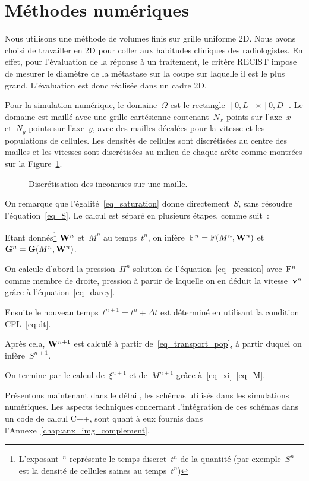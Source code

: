 \documentclass[main.tex]{subfiles}
\begin{document}
\section{Méthodes numériques}\label{sec:NumMet}

Nous utilisons une méthode de volumes finis sur grille uniforme 2D. 
Nous avons choisi de travailler en 2D pour coller aux habitudes cliniques des radiologistes. En effet, pour l'évaluation de la réponse à un traitement, le critère RECIST impose de mesurer le diamètre de la métastase sur la coupe sur laquelle il est le plus grand. L'évaluation est donc réalisée dans un cadre 2D.


Pour la simulation numérique, le domaine~$\Omega$ est le 
rectangle~$[0,L]\times[0,D]$. Le domaine est maillé avec une grille cartésienne contenant~$N_x$ points sur l'axe~$x$ et~$N_y$ points sur l'axe~$y$, avec des mailles décalées pour la vitesse et les populations de cellules. 
Les densités de cellules sont discrétisées au centre des mailles et les vitesses sont discrétisées au milieu de chaque arête comme montrées sur la Figure~\ref{fig:place_inconnues}.

\begin{figure}[h]
\centering

\caption{Discrétisation des inconnues sur une maille.\label{fig:place_inconnues}}
\end{figure}


On remarque que l'égalité~\eqref{eq_saturation} donne directement~$S$, sans résoudre l'équation~\eqref{eq_S}. Le calcul est séparé en plusieurs étapes, comme suit~:
\begin{myitemize}
\item Etant donnés\footnote{L'exposant~$^n$ représente le temps discret~$t^n$ de la quantité 
(par exemple~$S^n$ est la densité de cellules saines au temps~$t^n$)}
${\bf W}^n$ et~$M^n$ au temps~$t^n$, on infère~${\rm F}^n={\rm F}(M^n,{\bf W}^n)$ et
${\bf G}^n={\bf G}(M^n,{\bf W}^n)$.
\item On calcule d'abord la pression~$\Pi^n$ solution de l'équation~\eqref{eq_pression} avec~${\rm F}^n$ comme membre de droite, pression à partir de laquelle on en  déduit la vitesse~$\mathbf{v}^n$ grâce à l'équation~\eqref{eq_darcy}.
\item Ensuite le nouveau temps~$t^{n+1}=t^n+\Delta t$ est déterminé en utilisant la condition  CFL~\eqref{eq:dt}.
\item Après cela, ${\bf W}^{n+1}$ est calculé à partir de~\eqref{eq_transport_pop}, à partir duquel on infère~$S^{n+1}$.
\item On termine par le calcul de~$\xi^{n+1}$ et de~$M^{n+1}$ grâce à~\eqref{eq_xi}--\eqref{eq_M}.
\end{myitemize}
Présentons maintenant dans le détail, les schémas utilisés dans les simulations numériques. 
Les aspects techniques concernant l'intégration de ces schémas dans un code de calcul C++, sont quant à eux fournis dans l'Annexe~\ref{chap:anx_img_complement}.
\end{document}
